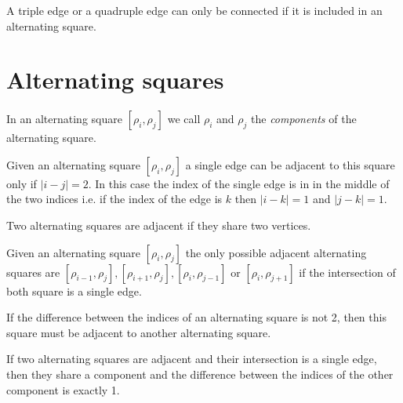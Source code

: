 \begin{proposition}
  \label{continue-triple-edge}
  A triple edge or a quadruple edge can only be connected if it is included in an alternating square.
\end{proposition}

\section{Alternating squares}

\paragraph{}
In an alternating square $[\rho_i, \rho_j]$ we call $\rho_i$ and $\rho_j$ the \textit{components} of the alternating square.

\begin{proposition}
  \label{square-connection}
  Given an alternating square $[\rho_i, \rho_j]$ a single edge can be adjacent to this square only if $|i - j| = 2$. In this case the index of the single edge is in in the middle of the two indices i.e. if the index of the edge is $k$ then $|i-k| = 1$ and $|j-k| = 1$.
\end{proposition}

\begin{definition}
  Two alternating squares are adjacent if they share two vertices.
\end{definition}

\begin{proposition}
  \label{adjacent-squares}
  Given an alternating square $[\rho_i, \rho_j]$ the only possible adjacent alternating squares are $[\rho_{i-1}, \rho_j], [\rho_{i+1}, \rho_j], [\rho_i, \rho_{j-1}]$ or $[\rho_i, \rho_{j+1}]$ if the intersection of both square is a single edge.
\end{proposition}

\begin{corollary}
  \label{continue-alternating-square}
  If the difference between the indices of an alternating square is not 2, then this square must be adjacent to another alternating square.
\end{corollary}

\begin{corollary}
  If two alternating squares are adjacent and their intersection is a single edge, then they share a component and the difference between the indices of the other component is exactly 1.
\end{corollary}

